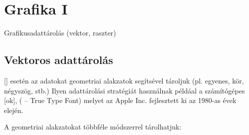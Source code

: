 \documentclass[../../main.tex]{subfiles}
\begin{document}
\section{Grafika I}

\begin{fulltheorem}
  Grafikusadattárolás (vektor, raszter)
\end{fulltheorem}

\subsection{Vektoros adattárolás}

[] esetén az adatokat geometriai alakzatok segítsével
tároljuk (pl. egyenes, kör, négyszög, stb.) Ilyen adattárolási stratégiát használnak
példáal a számítógépes [ok], ( -- True Type Font)
melyet az Apple Inc. fejlesztett ki az 1980-as évek elején.

A geometriai alakzatokat többféle módszerrel tárolhatjuk:
\end{document}
